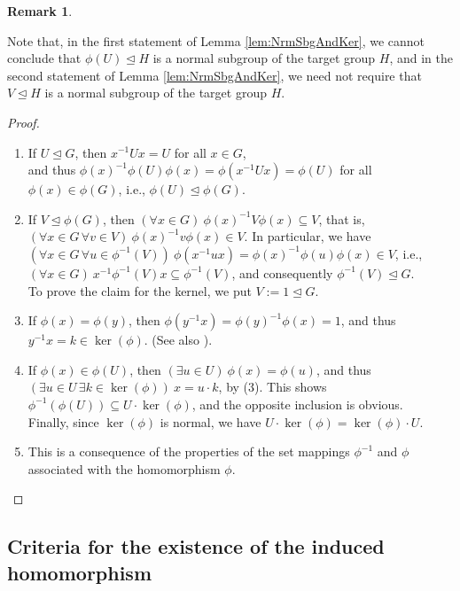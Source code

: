 \documentclass{amsart}
\theoremstyle{definition}
\newtheorem{remark}{Remark}[section]
\numberwithin{equation}{section}
\begin{document}
\begin{remark}
\label{rmk:NrmSbgAndKer}

Note that, in the first statement of Lemma
\ref{lem:NrmSbgAndKer},
we cannot conclude that \(\phi(U)\unlhd H\) is a normal subgroup of the target group \(H\),
and in the second statement of Lemma
\ref{lem:NrmSbgAndKer},
we need not require that \(V\unlhd H\) is a normal subgroup of the target group \(H\).

\end{remark}


\begin{proof}
\begin{enumerate}
\item
If \(U\unlhd G\), then \(x^{-1}Ux=U\) for all \(x\in G\),\\
and thus
\(\phi(x)^{-1}\phi(U)\phi(x)=\phi(x^{-1}Ux)=\phi(U)\) for all \(\phi(x)\in\phi(G)\), i.e., \(\phi(U)\unlhd\phi(G)\).
\item
If \(V\unlhd\phi(G)\), then \((\forall x\in G)\ \phi(x)^{-1}V\phi(x)\subseteq V\),
that is, \((\forall x\in G\,\forall v\in V)\ \phi(x)^{-1}v\phi(x)\in V\).
In particular, we have
\((\forall x\in G\,\forall u\in\phi^{-1}(V))\ \phi(x^{-1}ux)=\phi(x)^{-1}\phi(u)\phi(x)\in V\),
i.e., \((\forall x\in G)\ x^{-1}\phi^{-1}(V)x\subseteq\phi^{-1}(V)\),
and consequently \(\phi^{-1}(V)\unlhd G\).\\
To prove the claim for the kernel, we put \(V:=1\unlhd G\).
\item
If \(\phi(x)=\phi(y)\), then \(\phi(y^{-1}x)=\phi(y)^{-1}\phi(x)=1\), and thus
\(y^{-1}x=k\in\ker(\phi)\).
(See also
\cite[Thm.2.2.1, p.27]{Hl}).
\item
If \(\phi(x)\in\phi(U)\),
then \((\exists u\in U)\ \phi(x)=\phi(u)\),
and thus \((\exists u\in U\,\exists k\in\ker(\phi))\ x=u\cdot k\), by (3).
This shows \(\phi^{-1}(\phi(U))\subseteq U\cdot\ker(\phi)\), and the opposite inclusion is obvious.\\
Finally, since \(\ker(\phi)\) is normal, we have \(U\cdot\ker(\phi)=\ker(\phi)\cdot U\).
\item
This is a consequence of the properties of the set mappings \(\phi^{-1}\) and \(\phi\) associated with the homomorphism \(\phi\).
\end{enumerate}
\end{proof}



\subsection{Criteria for the existence of the induced homomorphism}
\label{ss:CritIndHom}
\end{document}

